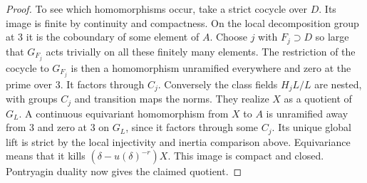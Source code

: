 \documentclass[a4paper,11pt]{article}
\theoremstyle{definition}
\theoremstyle{remark}
\numberwithin{equation}{section}
\begin{document}
\begin{proof}
To see which homomorphisms occur, take a strict cocycle over
\(D\). Its image is finite by continuity and compactness.
On the local decomposition group at \(3\) it is the coboundary
of some element of \(A\). Choose \(j\) with \(F_j\supset D\)
so large that \(G_{F_j}\) acts trivially on all these finitely
many elements. The restriction of the cocycle to \(G_{F_j}\)
is then a homomorphism unramified everywhere and zero at
the prime over \(3\). It factors through \(C_j\). Conversely
the class fields \(H_jL/L\) are nested, with groups \(C_j\)
and transition maps the norms. They realize \(X\) as a quotient
of \(G_L\). A continuous equivariant homomorphism from \(X\)
to \(A\) is unramified away from \(3\) and zero at \(3\) on
\(G_L\), since it factors through some \(C_j\). Its unique
global lift is strict by the local injectivity and inertia
comparison above. Equivariance means that it kills
\((\delta-u(\delta)^{-r})X\). This image is compact and closed.
Pontryagin duality now gives the claimed quotient.
\end{proof}
\end{document}
